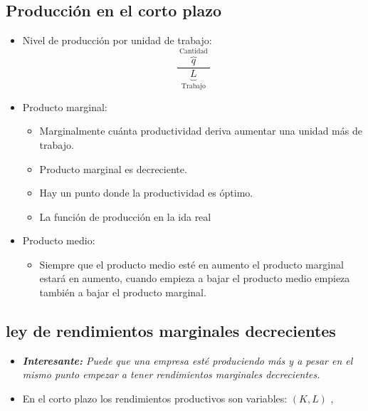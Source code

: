 \subsection{Producción en el corto plazo}
\begin{itemize}
    \item Nivel de producción por unidad de trabajo:
        \[
          \frac{\overbrace{q}^{\text{  Cantidad  }}}{\underbrace{L}_{\text{  Trabajo  }}} 
        \]
    
    \item Producto marginal:
        \begin{itemize}
            \item Marginalmente cuánta productividad deriva aumentar una unidad más de trabajo.
            \item Producto marginal es decreciente.
            \item Hay un punto donde la productividad es óptimo.
        \end{itemize}
        \begin{itemize}[label=\#]
            \item La función de producción en la ida real 
        \end{itemize}
    
    \item Producto medio:
        \begin{itemize}
            \item Siempre que el producto medio esté en aumento el producto marginal estará en aumento, cuando empieza a bajar el producto medio empieza también a bajar el producto marginal.
        \end{itemize}
    
\end{itemize}


\subsection{ley de rendimientos marginales decrecientes}
\begin{itemize}
    \item \emph{\textbf{Interesante:} Puede que una empresa esté produciendo más y a pesar en el mismo punto empezar a tener rendimientos marginales decrecientes.}
    \item En el corto plazo los rendimientos productivos son variables: $(K,L)$ , 
\end{itemize}



